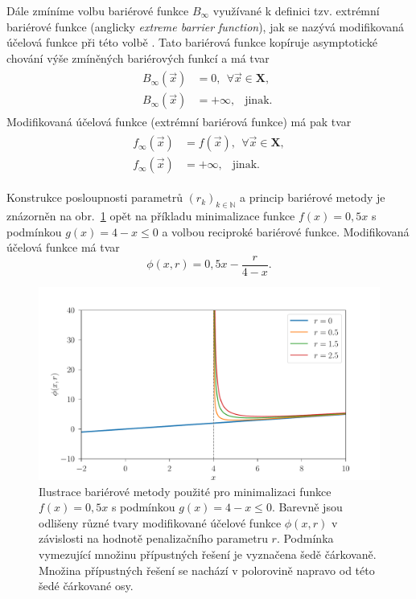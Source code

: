Dále zmíníme volbu bariérové funkce $ B_{\infty} $ využívané k definici tzv. extrémní bariérové funkce (anglicky \textit{extreme barrier function}), jak se nazývá modifikovaná účelová funkce při této volbě \cite{BBO-textbook}. Tato bariérová funkce kopíruje asymptotické chování výše zmíněných bariérových funkcí a má tvar
\begin{align}
\begin{split}
B_{\infty}(\vec{x}) &=0, \ \ \forall \vec{x} \in \mathbf{X},\\[6pt]
B_{\infty}(\vec{x}) &=+\infty, \ \ \text { jinak. }
\end{split}
\end{align}
Modifikovaná účelová funkce (extrémní bariérová funkce) má pak tvar
\begin{align}\label{eq:extreme barrier}
\begin{split}
f_{\infty}(\vec{x}) &=f(\vec{x}) , \ \ \forall \vec{x} \in \mathbf{X},\\[6pt]
f_{\infty}(\vec{x}) &=+\infty, \ \ \text { jinak. }
\end{split}
\end{align}

Konstrukce posloupnosti parametrů $ (r_k)_{k \in \mathbb{N}} $ a princip bariérové metody je znázorněn na obr.~\ref{fig:barrier} opět na příkladu minimalizace funkce $ f(x) = 0,5x $ s podmínkou $ g(x) = 4 - x \leq 0 $ a volbou reciproké bariérové funkce. Modifikovaná účelová funkce má tvar 
\begin{equation}
\phi (x, r) = 0,5x - \frac{r}{4-x}.
\end{equation}

\begin{figure}[H]
	\centering
	\includegraphics[width=1.0\textwidth]{Images/barrier.pdf}
	\caption{Ilustrace bariérové metody použité pro minimalizaci funkce $ f(x) = 0,5x $ s podmínkou $ g(x) = 4 - x \leq 0 $. Barevně jsou odlišeny různé tvary modifikované účelové funkce $\phi (x, r)  $ v závislosti na hodnotě penalizačního parametru $ r $. Podmínka vymezující množinu přípustných řešení je vyznačena šedě čárkovaně. Množina přípustných řešení se nachází v polorovině napravo od této šedé čárkované osy.}
	\label{fig:barrier}
\end{figure}

